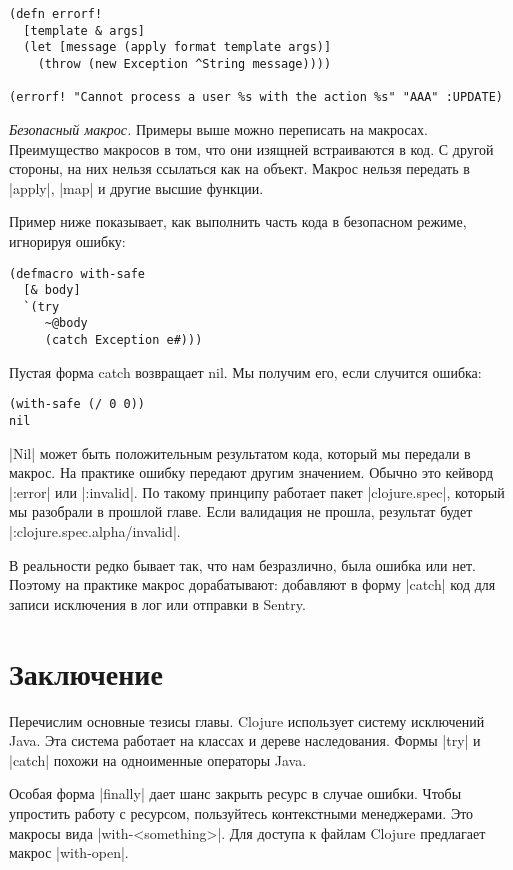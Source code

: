 \begin{verbatim}
(defn errorf!
  [template & args]
  (let [message (apply format template args)]
    (throw (new Exception ^String message))))

(errorf! "Cannot process a user %s with the action %s" "AAA" :UPDATE)
\end{verbatim}

\emph{Безопасный макрос.} Примеры выше можно переписать на макросах. Преимущество
макросов в том, что они изящней встраиваются в код. С другой стороны, на них
нельзя ссылаться как на объект. Макрос нельзя передать в \spverb|apply|, \spverb|map| и другие
высшие функции.

Пример ниже показывает, как выполнить часть кода в безопасном режиме, игнорируя
ошибку:

\begin{verbatim}
(defmacro with-safe
  [& body]
  `(try
     ~@body
     (catch Exception e#)))
\end{verbatim}

Пустая форма catch возвращает nil. Мы получим его, если случится ошибка:

\begin{verbatim}
(with-safe (/ 0 0))
nil
\end{verbatim}

\spverb|Nil| может быть положительным результатом кода, который мы передали в
макрос. На практике ошибку передают другим значением. Обычно это кейворд
\spverb|:error| или \spverb|:invalid|. По такому принципу работает пакет \spverb|clojure.spec|,
который мы разобрали в прошлой главе. Если валидация не прошла, результат будет
\spverb|:clojure.spec.alpha/invalid|.

В реальности редко бывает так, что нам безразлично, была ошибка или нет. Поэтому
на практике макрос дорабатывают: добавляют в форму \spverb|catch| код для записи
исключения в лог или отправки в Sentry.

\section{Заключение}

Перечислим основные тезисы главы. Clojure использует систему исключений
Java. Эта система работает на классах и дереве наследования. Формы \spverb|try| и
\spverb|catch| похожи на одноименные операторы Java.

Особая форма \spverb|finally| дает шанс закрыть ресурс в случае ошибки. Чтобы упростить
работу с ресурсом, пользуйтесь контекстными менеджерами. Это макросы вида
\spverb|with-<something>|. Для доступа к файлам Clojure предлагает макрос \spverb|with-open|.

